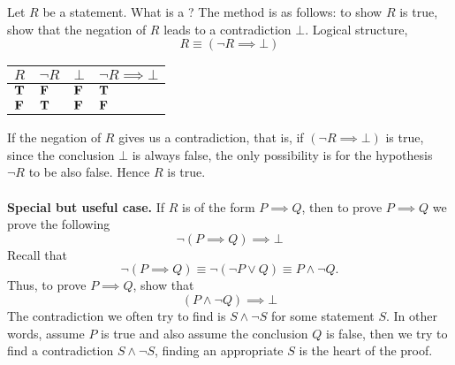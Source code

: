 \begin{discussion}
Let $R$ be a statement. What is a ? The method is as follows: to show $R$ is true, show that the negation of $R$ leads to a contradiction $\bot$. Logical structure,
\[R \equiv (\neg R \implies \bot)\]
\begin{center}
{\renewcommand{\arraystretch}{1.5}%
\begin{tabular}{|>{\centering}m{1cm}|>{\centering}m{1cm}|>{\centering}m{1cm}|>{\centering\arraybackslash}m{1.5cm}|}
\hline
\rowcolor{lightgrey}
$R$ & $\neg R$ & $\bot$ & $\neg R \implies \bot$ \\
\hline
$\mathbf{T}$ & $\mathbf{F}$ & $\mathbf{F}$ & $\mathbf{T}$\\
\hline
$\mathbf{F}$ & $\mathbf{T}$ & $\mathbf{F}$ & $\mathbf{F}$\\
\hline
\end{tabular}
}
\end{center}
If the negation of $R$ gives us a contradiction, that is, if $(\neg R \implies \bot)$ is true, since the conclusion $\bot$ is always false, the only possibility is for the hypothesis $\neg R$ to be also false. Hence $R$ is true.\\
\\
{\bf Special but useful case.} If $R$ is of the form $P \implies Q$, then to prove $P \implies Q$ we prove the following
\[\neg(P \implies Q) \implies \bot\]
Recall that \[\neg(P \implies Q) \equiv \neg(\neg P \vee Q) \equiv P \wedge \neg Q.\] Thus, to prove $P \implies Q$, show that
\[(P \wedge \neg Q) \implies \bot\]
The contradiction we often try to find is $S \wedge \neg S$ for some statement $S$. In other words, assume $P$ is true and also assume the conclusion $Q$ is false, then we try to find a contradiction $S \wedge \neg S$, finding an appropriate $S$ is the heart of the proof.
\end{discussion}

\vspace*{1em}

